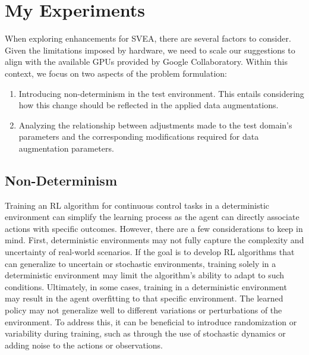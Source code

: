 \newpage
\section{My Experiments}

When exploring enhancements for SVEA, there are several factors to consider. Given the limitations imposed by hardware, we need to scale our suggestions to align with the available GPUs provided by Google Collaboratory. Within this context, we focus on two aspects of the problem formulation:
\begin{enumerate}
    \item Introducing non-determinism in the test environment. This entails considering how this change should be reflected in the applied data augmentations.
    
    \item Analyzing the relationship between adjustments made to the test domain's parameters and the corresponding modifications required for data augmentation parameters. 
\end{enumerate}

\subsection{Non-Determinism}
Training an RL algorithm for continuous control tasks in a deterministic environment can simplify the learning process as the agent can directly associate actions with specific outcomes. However, there are a few considerations to keep in mind. First, deterministic environments may not fully capture the complexity and uncertainty of real-world scenarios. If the goal is to develop RL algorithms that can generalize to uncertain or stochastic environments, training solely in a deterministic environment may limit the algorithm's ability to adapt to such conditions.
Ultimately, in some cases, training in a deterministic environment may result in the agent overfitting to that specific environment. The learned policy may not generalize well to different variations or perturbations of the environment. To address this, it can be beneficial to introduce randomization or variability during training, such as through the use of stochastic dynamics or adding noise to the actions or observations.

